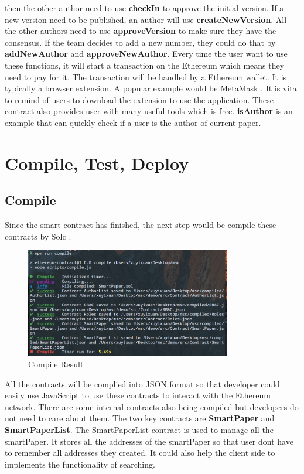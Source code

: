 \documentclass[openany,12pt]{ecsthesis}      %
\begin{document}
then the other author need to use \textbf{checkIn} to approve the initial version.
If a new version need to be published, an author will use \textbf{createNewVersion}. 
All the other authors need to use \textbf{approveVersion} to make sure they have the consensus.
If the team decides to add a new number, they could do that by \textbf{addNewAuthor} and \textbf{approveNewAuthor}.
Every time the user want to use these functions, 
it will start a transaction on the Ethereum which means they need to pay for it.
The transaction will be handled by a Ethereum wallet. It is typically a browser extension. 
A popular example would be MetaMask \cite{metamask}. 
It is vital to remind of users to download the extension to use the application.
These contract also provides user with many useful tools which is free. 
\textbf{isAuthor} is an example that can quickly check if a user is the author of current paper.
\section{Compile, Test, Deploy}
\subsection{Compile}
Since the smart contract has finished, the next step would be compile these contracts by Solc \cite{solc}.
\begin{figure}[H]
  \centering
  \includegraphics[width=0.8\textwidth]{compile.png}
  \caption{Compile Result}
  \label{compile} 
\end{figure}
All the contracts will be complied into JSON format so that developer could easily use JavaScript to use these contracts to interact with the Ethereum network.
There are some internal contracts also being compiled but developers do not need to care about them. The two key contracts are \textbf{SmartPaper} and \textbf{SmartPaperList}.
The SmartPaperList contract is used to manage all the smartPaper. 
It stores all the addresses of the smartPaper so that user dont have to remember all addresses they created.
It could also help the client side to implements the functionality of searching.
\end{document}

